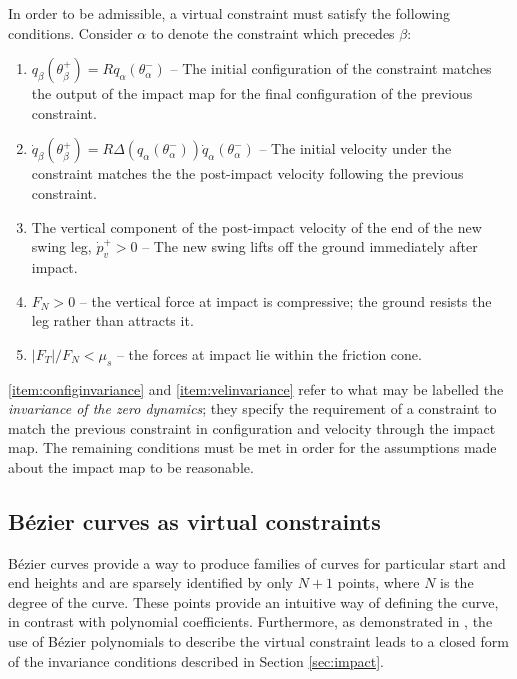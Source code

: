 In order to be admissible, a virtual constraint must satisfy the following conditions. Consider $\alpha$ to denote the constraint which precedes $\beta$:
\begin{samepage}
\begin{adjustwidth}{1.8cm}{}
\begin{enumerate}[label=\bfseries Condition \arabic*, parsep=0pt]
	\item $q_\beta\left(\theta_\beta^+\right) = Rq_\alpha\left(\theta_\alpha^-\right)$ -- The initial configuration of the constraint matches the output of the impact map for the final configuration of the previous constraint. \label{item:configinvariance}
	\item $\dot{q}_\beta\left(\theta_\beta^+\right) = R\Delta\left(q_\alpha(\theta_\alpha^-)\right)\dot{q}_\alpha\left(\theta_\alpha^-\right)$ -- The initial velocity under the constraint matches the the post-impact velocity following the previous constraint. \label{item:velinvariance}
	\item The vertical component of the post-impact velocity of the end of the new swing leg, $\dot{p}_v^+ > 0$ -- The new swing lifts off the ground immediately after impact. \label{item:liftoff}
	\item $F_N > 0$ -- the vertical force at impact is compressive; the ground resists the leg rather than attracts it. \label{item:posnormalF}
	\item $|F_T|/F_N<\mu_s$ -- the forces at impact lie within the friction cone. \label{item:frictioncone}
\end{enumerate}
\end{adjustwidth}
\end{samepage}

\ref{item:configinvariance} and \ref{item:velinvariance} refer to what may be labelled the \textit{invariance of the zero dynamics}; they specify the requirement of a constraint to match the previous constraint in configuration and velocity through the impact map. The remaining conditions must be met in order for the assumptions made about the impact map to be reasonable.

\subsection{B{\'e}zier curves as virtual constraints}
Bézier curves provide a way to produce families of curves for particular start and end heights and are sparsely identified by only $N+1$ points, where $N$ is the degree of the curve. These points provide an intuitive way of defining the curve, in contrast with polynomial coefficients. Furthermore, as demonstrated in \cite{westervelt2007feedback}, the use of Bézier polynomials to describe the virtual constraint leads to a closed form of the invariance conditions described in Section \ref{sec:impact}. 

